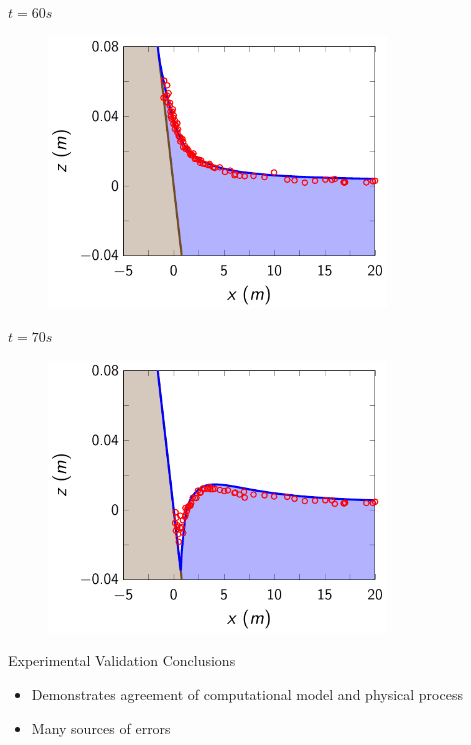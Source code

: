 \documentclass[]{beamer}
\begin{document}
\begin{frame}{$t=60s$}
	\begin{figure}
		\includegraphics[width=0.8\textwidth]{./Pics/DryBed/Syn/t=60s.pdf}
	\end{figure}
\end{frame}

\begin{frame}{$t=70s$}
	\begin{figure}
		\includegraphics[width=0.8\textwidth]{./Pics/DryBed/Syn/t=70s.pdf}
	\end{figure}
\end{frame}
\begin{frame}{Experimental Validation Conclusions}
	\begin{itemize}
		\item Demonstrates agreement of computational model and physical process
		\item Many sources of errors
	\end{itemize}
\end{frame}
\end{document}
